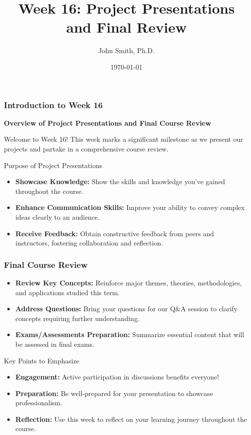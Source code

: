 \documentclass[aspectratio=169]{beamer}
\title[Week 16: Project Presentations and Final Review]{Week 16: Project Presentations and Final Review}
\author[J. Smith]{John Smith, Ph.D.}
\institute[University Name]{
  Department of Computer Science\\
  University Name\\
  \vspace{0.3cm}
  Email: email@university.edu\\
  Website: www.university.edu
}
\date{\today}
\begin{document}
\frame{\titlepage}

\begin{frame}[fragile]
    \frametitle{Introduction to Week 16}
    \textbf{Overview of Project Presentations and Final Course Review}

    Welcome to Week 16! This week marks a significant milestone as we present our projects and partake in a comprehensive course review. 

    \begin{block}{Purpose of Project Presentations}
        \begin{itemize}
            \item \textbf{Showcase Knowledge:} Show the skills and knowledge you've gained throughout the course.
            \item \textbf{Enhance Communication Skills:} Improve your ability to convey complex ideas clearly to an audience.
            \item \textbf{Receive Feedback:} Obtain constructive feedback from peers and instructors, fostering collaboration and reflection.
        \end{itemize}
    \end{block}
\end{frame}

\begin{frame}[fragile]
    \frametitle{Final Course Review}
    \begin{itemize}
        \item \textbf{Review Key Concepts:} Reinforce major themes, theories, methodologies, and applications studied this term.
        \item \textbf{Address Questions:} Bring your questions for our Q\&A session to clarify concepts requiring further understanding.
        \item \textbf{Exams/Assessments Preparation:} Summarize essential content that will be assessed in final exams.
    \end{itemize}
    
    \begin{block}{Key Points to Emphasize}
        \begin{itemize}
            \item \textbf{Engagement:} Active participation in discussions benefits everyone!
            \item \textbf{Preparation:} Be well-prepared for your presentation to showcase professionalism.
            \item \textbf{Reflection:} Use this week to reflect on your learning journey throughout the course.
        \end{itemize}
    \end{block}
\end{frame}
\end{document}
